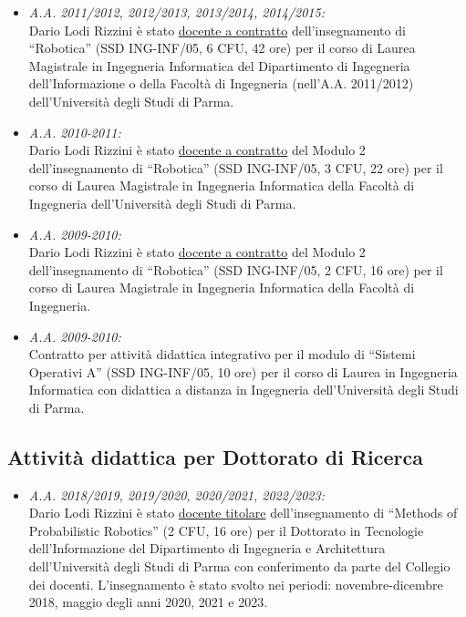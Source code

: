 \documentclass[11pt]{article}
\newcommand{\ITEMDATE}[1]{\item \textit{#1:}\\}
\begin{document}
\begin{itemize}
\begin{itemize}
\ITEMDATE{A.A. 2011/2012, 2012/2013, 2013/2014, 2014/2015}
Dario Lodi Rizzini \`e stato \underline{docente a contratto} dell'insegnamento di ``Robotica'' (SSD ING-INF/05, 6 CFU, 42 ore)
per il corso di Laurea Magistrale in Ingegneria Informatica del Dipartimento di Ingegneria dell'Informazione 
o della Facolt\`a di Ingegneria (nell'A.A. 2011/2012)
dell'Universit\`a degli Studi di Parma.


\ITEMDATE{A.A. 2010-2011}
Dario Lodi Rizzini \`e stato \underline{docente a contratto} del Modulo 2 dell'insegnamento di ``Robotica'' 
(SSD ING-INF/05, 3 CFU, 22 ore) per il corso di Laurea Magistrale in Ingegneria Informatica 
della Facolt\`a di Ingegneria dell'Universit\`a degli Studi di Parma.

\ITEMDATE{A.A. 2009-2010}
Dario Lodi Rizzini \`e stato \underline{docente a contratto} del Modulo 2 dell'insegnamento di ``Robotica'' 
(SSD ING-INF/05, 2 CFU, 16 ore) per il corso di Laurea Magistrale in Ingegneria Informatica della Facolt\`a di Ingegneria.

\ITEMDATE{A.A. 2009-2010}
Contratto per attivit\`a didattica integrativo per il modulo di
``Sistemi Operativi A'' (SSD ING-INF/05, 10 ore) per il corso di Laurea in Ingegneria Informatica con didattica a 
distanza in Ingegneria dell'Universit\`a degli Studi di Parma.
\end{itemize}

\subsection*{Attivit\`a didattica per Dottorato di Ricerca}

\begin{itemize}

\ITEMDATE{A.A. 2018/2019, 2019/2020, 2020/2021, 2022/2023}
Dario Lodi Rizzini \`e stato \underline{docente titolare} dell'insegnamento di ``Methods of Probabilistic Robotics'' (2 CFU, 16 ore)
per il Dottorato in Tecnologie dell'Informazione del Dipartimento di Ingegneria e Architettura 
dell'Universit\`a degli Studi di Parma con conferimento da parte del Collegio dei docenti. 
L'insegnamento \`e stato svolto nei periodi: novembre-dicembre 2018, maggio degli anni 2020, 2021 e 2023. 


\end{itemize}
\end{itemize}
\end{document}
